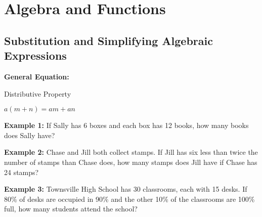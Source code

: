 \chapter{Algebra and Functions}

\section{Substitution and Simplifying Algebraic Expressions}

\textbf{General Equation:}

\begin{center}
Distributive Property

$a(m+n)=am+an$
\end{center}

\vfill
\textbf{Example 1:} If Sally has 6 boxes and each box has 12 books, how many books does Sally have?

\vfill
\textbf{Example 2:} Chase and Jill both collect stamps. If Jill has six less than twice the number of stamps than Chase does, how many stamps does Jill have if Chase has 24 stamps?

\vfill
\textbf{Example 3:} Townsville High School has 30 classrooms, each with 15 desks. If 80\% of desks are occupied in 90\% and the other 10\% of the classrooms are 100\% full, how many students attend the school?

